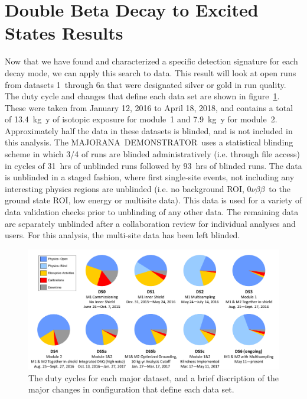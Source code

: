\documentclass[notitlepage,rmp,aps,10pt]{revtex4-1}
\newcommand{\MJ}{M{\footnotesize AJORANA}}
\newcommand{\Demo}{D{\footnotesize EMON\-STRAT\-OR}}
\newcommand{\MJD}{\MJ\ \Demo}
\newcommand{\znbb}{${0 \nu \beta \beta}$}
\begin{document}
\section{Double Beta Decay to Excited States Results}
Now that we have found and characterized a specific detection signature for each decay mode, we can apply this search to data.
This result will look at open runs from datasets 1~through 6a that were designated silver or gold in run quality.
The duty cycle and changes that define each data set are shown in figure~\ref{fig:dutycycle}.
These were taken from January 12, 2016 to April 18, 2018, and contains a total of 13.4~kg~y of isotopic exposure for module~1 and 7.9~kg~y for module~2.
Approximately half the data in these datasets is blinded, and is not included in this analysis.
The \MJD\ uses a statistical blinding scheme in which 3/4 of runs are blinded administratively (i.e. through file access) in cycles of 31~hrs of unblinded runs followed by 93~hrs of blinded runs.
The data is unblinded in a staged fashion, where first single-site events, not including any interesting physics regions are unblinded (i.e. no background ROI, \znbb\ to the ground state ROI, low energy or multisite data).
This data is used for a variety of data validation checks prior to unblinding of any other data.
The remaining data are separately unblinded after a collaboration review for individual analyses and users.
For this analysis, the multi-site data has been left blinded.
\\
\begin{figure}[h]
  \centering
  \includegraphics[width=0.9\linewidth]{dutycycle}
  \caption[Dataset and Duty Cycle Summary]{\label{fig:dutycycle}
    The duty cycles for each major dataset, and a brief discription of the major changes in configuration that define each data set.
  }
\end{figure}
\end{document}

